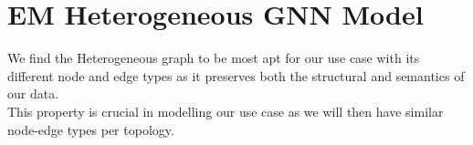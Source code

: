 \documentclass{report} %
\begin{document}







\section{\ac{EM} Heterogeneous \ac{GNN} Model}\label{sec:EM Heterogeneous GNN Model}

We find the Heterogeneous graph to be most apt for our use case with its different node and edge types as it preserves both the structural and semantics of our data. \\
This property is crucial in modelling our use case as we will then have similar node-edge types per topology. \\
\end{document}
